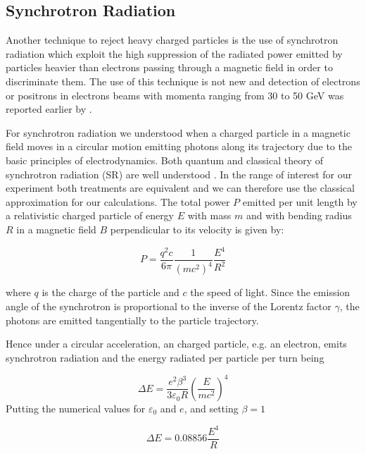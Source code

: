 
\subsection{Synchrotron Radiation}

Another technique to reject heavy charged particles is the use of synchrotron radiation which exploit the high
suppression of the radiated power emitted by particles heavier than electrons passing through a magnetic field in order
to discriminate them.  The use of this technique is not new and detection of electrons or positrons in electrons beams
with momenta ranging from 30 to 50 GeV was reported earlier by \cite{srd1,srd2,srd3}.\par

For synchrotron radiation we understood when a charged particle in a magnetic field moves in a circular motion emitting
photons along its trajectory due to the basic principles of electrodynamics. Both quantum and classical theory of
synchrotron radiation (SR) are well understood \cite{synchrotron}. In the range of interest for our experiment both
treatments are equivalent and we can therefore use the classical approximation for our calculations. The total power $P$
emitted per unit length by a relativistic charged particle of energy $E$ with mass $m$ and with bending radius $R$ in a
magnetic field $B$ perpendicular to its velocity is given by:


\begin{equation}
P = \frac{q^2c}{6\pi}\frac{1}{(mc^2)^4}\frac{E^4}{R^2}
\end{equation}

where $q$ is the charge of the particle and $c$ the speed of light. Since the emission angle of the synchrotron is
proportional to the inverse of the Lorentz factor $\gamma$, the photons are emitted tangentially to the particle
trajectory.\par

Hence under a circular acceleration, an charged particle, e.g. an electron, emits synchrotron radiation and the energy
radiated per particle per turn being

\begin{equation}
\Delta E = \frac{e^2\beta^3}{3\varepsilon_0 R}\left (\frac{E}{mc^2}\right )^4
\end{equation}
Putting the numerical values for $\varepsilon_0$ and $e$, and setting $\beta=1$

\begin{equation}
\Delta E = 0.08856\frac{E^4}{R}
\end{equation}

